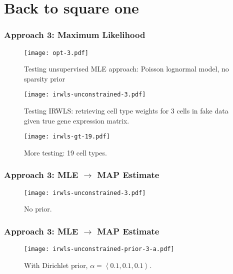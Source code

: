 \documentclass{beamer}
\newcommand{\importfig}[1]{{#1.tex}}
\begin{document}
\section{Back to square one}

\begin{frame}
    \frametitle{Approach 3: Maximum Likelihood}
    \begin{figure}[!htbp]
        \centering
        \texttt{[image: opt-3.pdf]}
        \caption{Testing unsupervised MLE approach: Poisson lognormal model, no sparsity prior}
    \end{figure}
\end{frame}

\begin{frame}
    \begin{figure}[!htbp]
        \centering
        \texttt{[image: irwls-unconstrained-3.pdf]}
        \caption{Testing IRWLS: retrieving cell type weights for 3 cells in fake data given true gene expression matrix.}
    \end{figure}
\end{frame}

\begin{frame}
    \begin{figure}[!htbp]
        \centering
        \texttt{[image: irwls-gt-19.pdf]}
        \caption{More testing: 19 cell types.}
    \end{figure}
\end{frame}

\begin{frame}
    \frametitle{Approach 3: MLE $\to$ MAP Estimate}
    \begin{figure}[!htbp]
        \centering
        \texttt{[image: irwls-unconstrained-3.pdf]}
        \caption{No prior.}
    \end{figure}
\end{frame}

\begin{frame}
    \frametitle{Approach 3: MLE $\to$ MAP Estimate}
    \begin{figure}[!htbp]
        \centering
        \texttt{[image: irwls-unconstrained-prior-3-a.pdf]}
        \caption{With Dirichlet prior, $\alpha = \left\langle 0.1, 0.1, 0.1 \right\rangle$.}
    \end{figure}
\end{frame}
\end{document}
